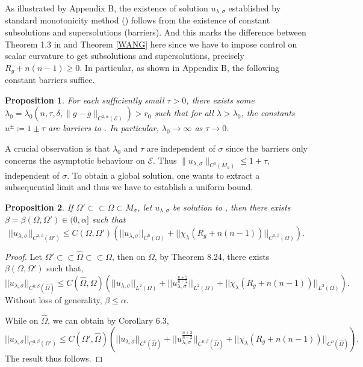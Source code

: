 \documentclass[11pt]{amsart}
\makeatletter
\renewcommand*{\eqref}[1]{%
  \hyperref[{#1}]{\textup{\tagform@{\ref*{#1}}}}%
}
\newtheorem{prop}{Proposition}[section]
\theoremstyle{remark}
\numberwithin{equation}{section}
\def\b{{\beta}}
\def\l{\lambda}
\def\mE{\mathcal{E}}
\def\mE{\mathcal{E}}
\def\l {\lambda}
\makeatother
\begin{document}
{{ 
As illustrated by \cite{DGS} Appendix B, the existence of solution $u_{\l,\sigma}$ established by standard monotonicity method (\cite{G}) follows from the existence of constant subsolutions and supersolutions (barriers).  And this marks the difference between Theorem 1.3 in \cite{LLU22} and Theorem \ref{WANG} here since we have to impose control on scalar curvature to get subsolutions and supersolutions, precisely $R_g+n(n-1)\geq 0$.  In particular, as shown in \cite{DGS} Appendix B, the following constant barriers suffice. 
\begin{prop}
\label{bound}
For each sufficiently small $\tau > 0$, there exists some $\lambda_0 =\lambda_0(n, \tau, \delta, \|g - \bar g\|_{C^{2,\alpha}(\mathcal E)})> r_0$ such that for all $\lambda > \lambda_0$, the constants $u^{\pm} \coloneqq 1 \pm \tau$ are barriers to \eqref{exhaustion}. In particular, $\lambda_0 \to \infty $ as $\tau\to 0$.  
\end{prop}

A crucial observation is that $\lambda_0$ and $\tau$ are independent of $\sigma$ since the barriers only concerns the asymptotic behaviour on $\mE$.  Thus $\|u_{\l,\sigma}\|_{C^0(M_{\sigma})}\leq 1+\tau $,  independent of $\sigma$. To obtain a global solution, one wants to extract a subsequential limit and thus we have to establish a uniform bound. 

\begin{prop}\label{DNM}
If $\Omega'\subset\subset\Omega\subset M_{\sigma}$,  let $u_{\l,\sigma}$ be solution to \eqref{exhaustion}, then there exists $\beta=\beta(\Omega,\Omega')\in(0,\alpha]$ such that
\begin{equation}\label{Holder}
||u_{\l,\sigma}||_{C^{2,\b}(\Omega')}\leq C(\Omega,\Omega')\left( ||u_{\l,\sigma}||_{C^{0}(\Omega)} + ||\chi_{\l}(R_g+n(n-1))||_{C^{0,\b}(\Omega)} \right).  
\end{equation}
\end{prop}
\begin{proof} 
Let $\Omega' \subset\subset \hat \Omega \subset\subset \Omega$, then on $\Omega$, by \cite{GT} Theorem 8.24, there exists $\beta(\Omega,\Omega')$ such that, 
$$||u_{\l,\sigma}||_{C^{0,\b}(\hat \Omega)}\leq C(\hat \Omega, \Omega)\left( ||u_{\l,\sigma}||_{L^2(\Omega)}+||u_{\l,\sigma}^{\frac{n+2}{n-2}}||_{L^2(\Omega)}+||\chi_{\l}(R_g+n(n-1))||_{L^2(\Omega)}\right).$$ Without loss of generality, $\beta\leq \alpha$. 



While on $\hat \Omega$, we can obtain by \cite{GT} Corollary 6.3, 
$$||u_{\l,\sigma}||_{C^{2,\b}(\Omega')}\leq C(\Omega',\hat \Omega)\left( ||u_{\l,\sigma}||_{C^{0}(\hat\Omega)} + ||u_{\l,\sigma}^{\frac{n+2}{n-2}}||_{C^{0,\b}(\hat \Omega)} + ||\chi_{\l}(R_g+n(n-1))||_{C^{0}(\hat\Omega)}  \right).$$
The result thus follows.  
\end{proof} 

}}
\end{document}
